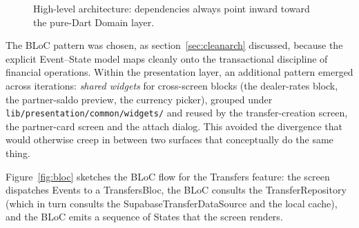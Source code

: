 \begin{figure}[h]
  \centering
  \caption{High-level architecture: dependencies always point inward toward the pure-Dart Domain layer.}
  \label{fig:arch}
\end{figure}

The BLoC pattern was chosen, as section~\ref{sec:cleanarch} discussed, because the explicit Event--State model maps cleanly onto the transactional discipline of financial operations. Within the presentation layer, an additional pattern emerged across iterations: \emph{shared widgets} for cross-screen blocks (the dealer-rates block, the partner-saldo preview, the currency picker), grouped under \texttt{lib/presentation/common/widgets/} and reused by the transfer-creation screen, the partner-card screen and the attach dialog. This avoided the divergence that would otherwise creep in between two surfaces that conceptually do the same thing.

Figure~\ref{fig:bloc} sketches the BLoC flow for the Transfers feature: the screen dispatches Events to a TransfersBloc, the BLoC consults the TransferRepository (which in turn consults the SupabaseTransferDataSource and the local cache), and the BLoC emits a sequence of States that the screen renders.

